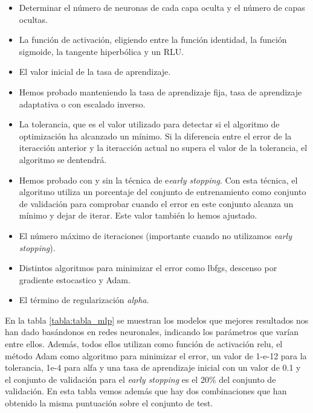 \documentclass[journal,twoside]{JoPhA}
\begin{document}
\begin{itemize}
	\item Determinar el número de neuronas de cada capa oculta y el número de capas ocultas.  \\
	\item La función de activación, eligiendo entre la función identidad, la función sigmoide, la tangente hiperbólica y un RLU. \\
	\item El valor inicial de la tasa de aprendizaje.  \\
	\item Hemos probado manteniendo la tasa de aprendizaje fija, tasa de aprendizaje adaptativa o con escalado inverso.  \\
	\item La tolerancia, que es el valor utilizado para detectar si el algoritmo de optimización ha alcanzado un mínimo. Si la diferencia entre el error de la iteracción anterior y la iteracción actual no supera el valor de la tolerancia, el algoritmo se dentendrá.  \\
	\item Hemos probado con y sin la técnica de e\textit{early stopping}. Con esta técnica, el algoritmo utiliza un porcentaje del conjunto de entrenamiento como conjunto de validación para comprobar cuando el error en este conjunto alcanza un mínimo y dejar de iterar. Este valor también lo hemos ajustado.   \\
	\item El número máximo de iteraciones (importante cuando no utilizamos \textit{early stopping}).  \\
	\item Distintos algoritmos para minimizar el error como lbfgs, descenso por gradiente estocastico y Adam.  \\
	\item El término de regularización \textit{alpha}.  \\
\end{itemize}

En la tabla \ref{tabla:tabla_mlp} se muestran los modelos que mejores resultados nos han dado basándonos en redes neuronales, indicando los parámetros que varían entre ellos. Además, todos ellos utilizan como función de activación relu, el método Adam como algoritmo para minimizar el error, un valor de 1-e-12 para la tolerancia, 1e-4 para alfa y una tasa de aprendizaje inicial con un valor de 0.1 y el conjunto de validación para el \textit{early stopping} es el 20\% del conjunto de validación. En esta tabla vemos además que hay dos combinaciones que han obtenido la misma puntuación sobre el conjunto de test.
\end{document}
